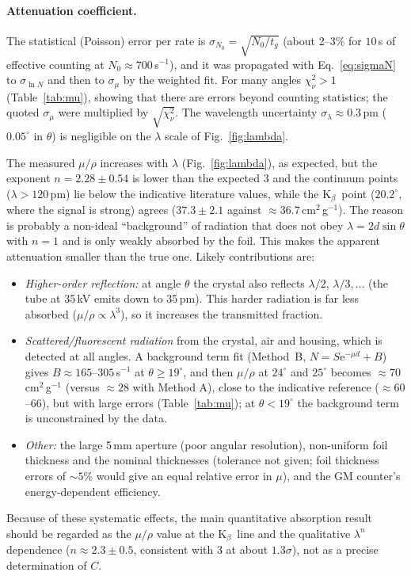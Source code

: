 \documentclass[11pt,a4paper]{article}
\newcommand{\Kb}{K$_\beta$}
\newcommand{\eu}{\mathrm{e}}
\begin{document}
\paragraph{Attenuation coefficient.} The statistical (Poisson) error per rate is $\sigma_{N_0}=\sqrt{N_0/t_g}$ (about 2--3\% for $10$\,s of effective counting at $N_0\approx700$\,s$^{-1}$), and it was propagated with Eq.~\eqref{eq:sigmaN} to $\sigma_{\ln N}$ and then to $\sigma_\mu$ by the weighted fit. For many angles $\chi^2_\nu>1$ (Table~\ref{tab:mu}), showing that there are errors beyond counting statistics; the quoted $\sigma_\mu$ were multiplied by $\sqrt{\chi^2_\nu}$. The wavelength uncertainty $\sigma_\lambda\approx0.3$\,pm ($0.05^\circ$ in $\theta$) is negligible on the $\lambda$ scale of Fig.~\ref{fig:lambda}.

The measured $\mu/\rho$ increases with $\lambda$ (Fig.~\ref{fig:lambda}), as expected, but the exponent $n=2.28\pm0.54$ is lower than the expected 3 and the continuum points ($\lambda>120$\,pm) lie below the indicative literature values, while the \Kb\ point ($20.2^\circ$, where the signal is strong) agrees ($37.3\pm2.1$ against $\approx36.7$\,cm$^2$\,g$^{-1}$). The reason is probably a non-ideal ``background'' of radiation that does not obey $\lambda=2d\sin\theta$ with $n=1$ and is only weakly absorbed by the foil. This makes the apparent attenuation smaller than the true one. Likely contributions are:
\begin{itemize}[nosep]
\item \emph{Higher-order reflection:} at angle $\theta$ the crystal also reflects $\lambda/2$, $\lambda/3,\ldots$ (the tube at 35\,kV emits down to 35\,pm). This harder radiation is far less absorbed ($\mu/\rho\propto\lambda^3$), so it increases the transmitted fraction.
\item \emph{Scattered/fluorescent radiation} from the crystal, air and housing, which is detected at all angles. A background term fit (Method~B, $N=S\eu^{-\mu d}+B$) gives $B\approx165$--$305$\,s$^{-1}$ at $\theta\ge19^\circ$, and then $\mu/\rho$ at $24^\circ$ and $25^\circ$ becomes $\approx70$\,cm$^2$\,g$^{-1}$ (versus $\approx28$ with Method A), close to the indicative reference ($\approx60$--$66$), but with large errors (Table~\ref{tab:mu}); at $\theta<19^\circ$ the background term is unconstrained by the data.
\item \emph{Other:} the large 5\,mm aperture (poor angular resolution), non-uniform foil thickness and the nominal thicknesses (tolerance not given; foil thickness errors of $\sim5$\% would give an equal relative error in $\mu$), and the GM counter's energy-dependent efficiency.
\end{itemize}
Because of these systematic effects, the main quantitative absorption result should be regarded as the $\mu/\rho$ value at the \Kb\ line and the qualitative $\lambda^{n}$ dependence ($n\approx2.3\pm0.5$, consistent with 3 at about $1.3\sigma$), not as a precise determination of $C$.
\end{document}
